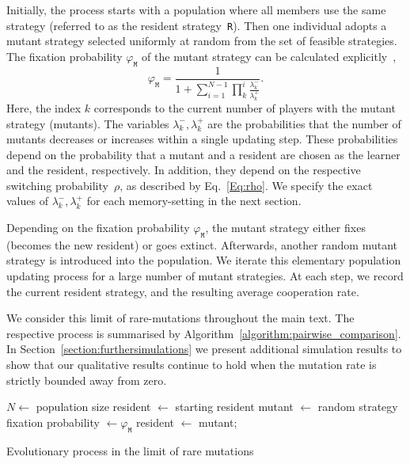 \documentclass[11pt]{article}
\def\resident{\texttt{R}}
\def\mutant{\texttt{M}}
\theoremstyle{plainCl1}
\theoremstyle{plainCl2}
\begin{document}

Initially, the process starts with a population where all members use the same strategy (referred to as the resident strategy~\resident). 
Then one individual adopts a mutant strategy selected uniformly at random from the set of feasible strategies.
The fixation probability \(\varphi_{\mutant}\) of the mutant strategy can be calculated explicitly~\citep{nowak:Nature:2004},
\begin{equation}\label{eq:fixation_probability}
    \varphi_{\mutant} = \frac{1}{1+\sum\limits_{i=1}^{N-1}\prod\limits_k^i \frac{\lambda^-_k}{\lambda^+_k}}.
\end{equation}
Here, the index $k$ corresponds to the current number of players with the mutant strategy (mutants). 
The variables \(\lambda^-_k, \lambda^+_k\) are the probabilities that the number of mutants decreases or increases within a single updating step. 
These probabilities depend on the probability that a mutant and a resident are chosen as the learner and the resident, respectively. 
In addition, they depend on the respective switching probability~$\rho$, as described by Eq.~\eqref{Eq:rho}. 
We specify the exact values of  \(\lambda^-_k, \lambda^+_k\) for each memory-setting in the next section. 

Depending on the fixation probability \(\varphi_{\mutant}\), the mutant strategy either fixes (becomes the new resident) or goes extinct. 
Afterwards, another random mutant strategy is introduced into the population. 
We iterate this elementary population updating process for a large number of mutant strategies. 
At each step, we record the current resident strategy, and the resulting average cooperation rate. 

We consider this limit of rare-mutations throughout the main text. 
The respective process is summarised by Algorithm~\ref{algorithm:pairwise_comparison}.
In Section~\ref{section:furthersimulations} we present additional simulation results to show that our qualitative results continue to hold when the mutation rate is strictly bounded away from zero. 


\begin{algorithm}[t]
  \SetAlgoLined
  $N \leftarrow$ population size\;
  resident $\leftarrow$ starting resident\;
   {mutant $\leftarrow$ random strategy\;
   fixation probability $\leftarrow \varphi_\mutant $\;
   \If{$\varphi_{\mutant} >$ random: $i \rightarrow [0,1]$}
   {resident $\leftarrow$ mutant;}}
   \caption{Evolutionary process in the limit of rare mutations}\label{algorithm:pairwise_comparison}
\end{algorithm}
\end{document}
